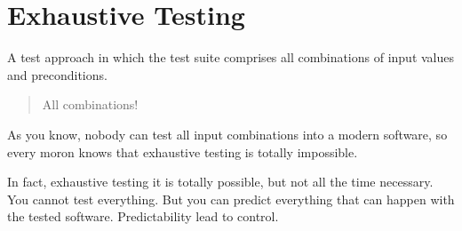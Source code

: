 \section{Exhaustive Testing}
\label{sec:Exhaustive Testing}

A test approach in which the test suite comprises all combinations of input values and preconditions.

\begin{quote}
All combinations!\end{quote} 

As you know, nobody can test all input combinations into a modern software, so every moron knows that exhaustive testing is totally impossible.

In fact, exhaustive testing it is totally possible, but not all the time necessary. You cannot test everything. But you can predict everything that can happen with the tested software. Predictability lead to control.